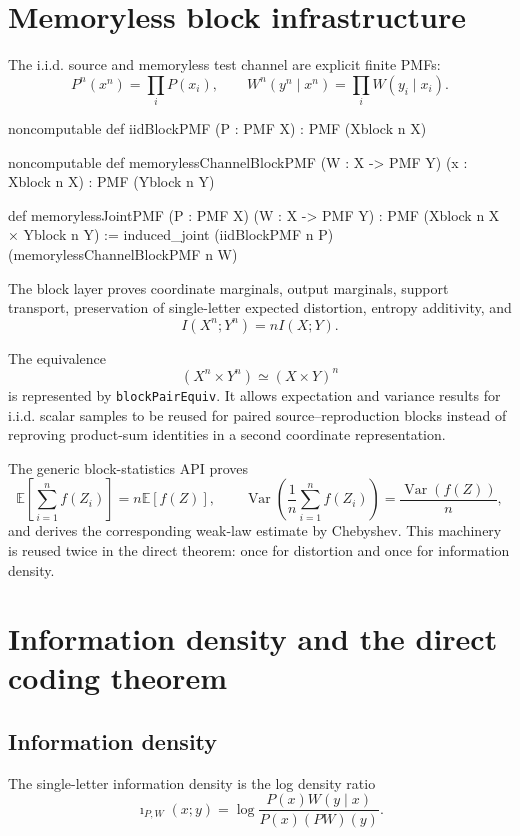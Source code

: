 \documentclass[11pt]{article}
\newcommand{\E}{\mathbb{E}}
\newcommand{\Var}{\operatorname{Var}}
\begin{document}
\section{Memoryless block infrastructure}

The i.i.d. source and memoryless test channel are explicit finite PMFs:
\[
  P^n(x^n)=\prod_i P(x_i),\qquad
  W^n(y^n\mid x^n)=\prod_i W(y_i\mid x_i).
\]

\begin{LeanCode}
noncomputable def iidBlockPMF (P : PMF X) : PMF (Xblock n X)

noncomputable def memorylessChannelBlockPMF
    (W : X -> PMF Y) (x : Xblock n X) : PMF (Yblock n Y)

def memorylessJointPMF (P : PMF X) (W : X -> PMF Y) :
    PMF (Xblock n X × Yblock n Y) :=
  induced_joint (iidBlockPMF n P) (memorylessChannelBlockPMF n W)
\end{LeanCode}

The block layer proves coordinate marginals, output marginals, support
transport, preservation of single-letter expected distortion, entropy
additivity, and
\[
  I(X^n;Y^n)=nI(X;Y).
\]

The equivalence
\[
  (X^n\times Y^n)\simeq (X\times Y)^n
\]
is represented by \texttt{block\allowbreak Pair\allowbreak Equiv}.  It allows expectation and variance
results for i.i.d. scalar samples to be reused for paired source--reproduction
blocks instead of reproving product-sum identities in a second coordinate
representation.

The generic block-statistics API proves
\[
  \E\!\left[\sum_{i=1}^n f(Z_i)\right]=n\E[f(Z)],
  \qquad
  \Var\!\left(\frac1n\sum_{i=1}^n f(Z_i)\right)
    =\frac{\Var(f(Z))}{n},
\]
and derives the corresponding weak-law estimate by Chebyshev.  This machinery
is reused twice in the direct theorem: once for distortion and once for
information density.

\section{Information density and the direct coding theorem}

\subsection{Information density}

The single-letter information density is the log density ratio
\[
  \imath_{P,W}(x;y)
  =\log\frac{P(x)W(y\mid x)}{P(x)(PW)(y)}.
\]
\end{document}
